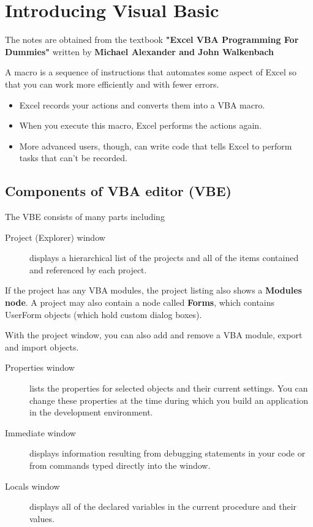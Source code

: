 \documentclass[
]{article}
\theoremstyle{definition}
\theoremstyle{definition}
\theoremstyle{definition}
\theoremstyle{definition}
\theoremstyle{remark}
\begin{document}
\hypertarget{introducing-visual-basic}{%
\section{Introducing Visual Basic}\label{introducing-visual-basic}}

The notes are obtained from the textbook \textbf{"Excel VBA Programming For
Dummies"} written by \textbf{Michael Alexander and John Walkenbach}

A macro is a sequence of instructions that automates some aspect of
Excel so that you can work more efficiently and with fewer errors.

\begin{itemize}
\item
  Excel records your actions and converts them into a VBA macro.
\item
  When you execute this macro, Excel performs the actions again.
\item
  More advanced users, though, can write code that tells Excel to
  perform tasks that can't be recorded.
\end{itemize}

\hypertarget{components-of-vba-editor-vbe}{%
\subsection{Components of VBA editor (VBE)}\label{components-of-vba-editor-vbe}}

The VBE consists of many parts including

\begin{description}
\item[Project (Explorer) window]
displays a hierarchical list of the projects and all of the items
contained and referenced by each project.
\end{description}

If the project has any VBA modules, the project listing also shows a
\textbf{Modules node}. A project may also contain a node called
\textbf{Forms}, which contains UserForm objects (which hold custom dialog
boxes).

With the project window, you can also add and remove a VBA module,
export and import objects.

\begin{description}
\item[Properties window]
lists the properties for selected objects and their current
settings. You can change these properties at the time during which
you build an application in the development environment.
\item[Immediate window]
displays information resulting from debugging statements in your
code or from commands typed directly into the window.
\item[Locals window]
displays all of the declared variables in the current procedure and
their values.
\end{description}
\end{document}

